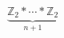 \documentclass[preview]{standalone}
\begin{document}
\begin{align*}
\underbrace{\mathbb{Z}_{2}\ast \cdots\ast \mathbb{Z}_{2}}_{n+1}
\end{align*}
\end{document}
